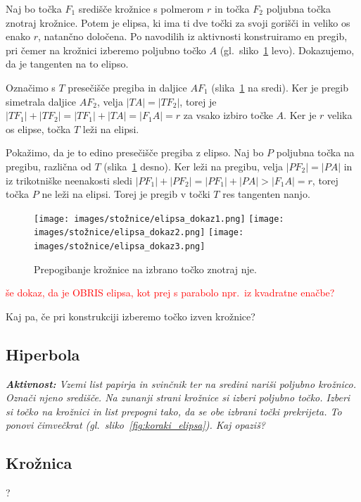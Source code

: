 \begin{dokaz}
    Naj bo točka $F_1$ središče krožnice s polmerom $r$ in točka $F_2$ poljubna točka znotraj krožnice. Potem je elipsa, ki ima ti dve točki za svoji gorišči in veliko os enako $r$, natančno določena. Po navodilih iz aktivnosti konstruiramo en pregib, pri čemer na krožnici izberemo poljubno točko $A$ (gl.\ sliko~\ref{fig:dokaz_elipsa} levo). Dokazujemo, da je tangenten na to elipso.

    Označimo s $T$ presečišče pregiba in daljice $AF_1$ (slika~\ref{fig:dokaz_elipsa} na sredi). Ker je pregib simetrala daljice $AF_2$, velja $|TA| = |TF_2|$, torej je $|TF_1| + |TF_2| = |TF_1| + |TA| = |F_1A| = r$ za vsako izbiro točke $A$. Ker je $r$ velika os elipse, točka $T$ leži na elipsi.

    Pokažimo, da je to edino presečišče pregiba z elipso. Naj bo $P$ poljubna točka na pregibu, različna od $T$ (slika~\ref{fig:dokaz_elipsa} desno). Ker leži na pregibu, velja $|PF_2| = |PA|$ in iz trikotniške neenakosti sledi $|PF_1| + |PF_2| = |PF_1| + |PA| > |F_1A| = r$, torej točka $P$ ne leži na elipsi. Torej je pregib v točki $T$ res tangenten nanjo.

    \begin{figure}[h]
        \centering
        \texttt{[image: images/stožnice/elipsa\_dokaz1.png]}
        \texttt{[image: images/stožnice/elipsa\_dokaz2.png]}
        \texttt{[image: images/stožnice/elipsa\_dokaz3.png]}
        \caption[Prepogibanje elipse]{Prepogibanje krožnice na izbrano točko znotraj nje.}
        \label{fig:dokaz_elipsa}
    \end{figure}  
\end{dokaz}

\textcolor{red}{še dokaz, da je OBRIS elipsa, kot prej s parabolo npr.\ iz kvadratne enačbe?}

Kaj pa, če pri konstrukciji izberemo točko izven krožnice?

\subsection{Hiperbola}

\textit{\textbf{Aktivnost:} Vzemi list papirja in svinčnik ter na sredini nariši poljubno krožnico. Označi njeno središče. Na zunanji strani krožnice si izberi poljubno točko. Izberi si točko na krožnici in list prepogni tako, da se obe izbrani točki prekrijeta. To ponovi čimvečkrat (gl.\ sliko~\ref{fig:koraki_elipsa}). Kaj opaziš?}

\subsection{Krožnica}

?